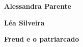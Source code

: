 \textbf{Alessandra Parente} \lipsum[1]

\textbf{Léa Silveira} \lipsum[1]

\textbf{Freud e o patriarcado} \lipsum[1]







